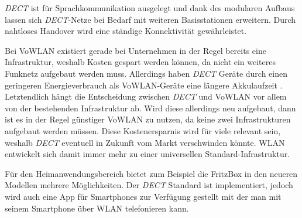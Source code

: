 \begin{multicols}{3}
\textit{DECT} ist für Sprachkommunikation ausgelegt und dank des modularen Aufbaus lassen sich \textit{DECT}-Netze bei Bedarf mit weiteren Basisstationen erweitern. Durch nahtloses Handover wird eine ständige Konnektivität gewährleistet.

Bei VoWLAN existiert gerade bei Unternehmen in der Regel bereits eine Infrastruktur, weshalb Kosten gespart werden können, da nicht ein weiteres Funknetz aufgebaut werden muss. Allerdings haben \textit{DECT} Geräte durch einen geringeren Energieverbrauch als VoWLAN-Geräte eine längere Akkulaufzeit .
Letztendlich hängt die Entscheidung zwischen \textit{DECT} und VoWLAN vor allem von der bestehenden Infrastruktur ab. Wird diese allerdings neu aufgebaut, dann ist es in der Regel günstiger VoWLAN zu nutzen, da keine zwei Infrastrukturen aufgebaut werden müssen. Diese Kostenersparnis wird für viele relevant sein, weshalb \textit{DECT} eventuell in Zukunft vom Markt verschwinden könnte. WLAN entwickelt sich damit immer mehr zu einer universellen Standard-Infrastruktur. 

Für den Heimanwendungsbereich bietet zum Beispiel die FritzBox in den neueren Modellen mehrere Möglichkeiten. Der \textit{DECT} Standard ist implementiert, jedoch wird auch eine App für Smartphones zur Verfügung gestellt mit der man mit seinem Smartphone über WLAN telefonieren kann. 
\cite{dect.6,dect.7,dect.8}

\printbibliography[segment=1,heading=subbibliography]
\end{multicols}
\newpage
